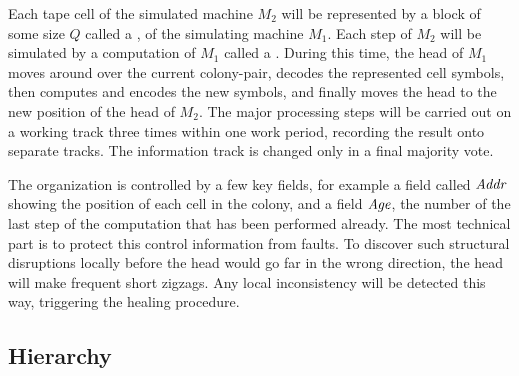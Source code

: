\documentclass[11pt]{memoir}
\theoremstyle{definition} %
\newcommand{\fld}[1]{\ensuremath{\textit{#1\/}}}
\newcommand{\Q}{Q} %
\newcommand{\Addr}{\fld{Addr}}
\newcommand{\Age}{\fld{Age}} %
\begin{document}
Each tape cell of the simulated machine \( M_{2} \) will be represented by a block of
some size \( \Q \) called a , of the simulating machine \( M_{1} \).
Each step of \( M_{2} \) will be simulated by a computation of \( M_{1} \) called
a .
During this time, the head of \( M_{1} \) moves around over the
current colony-pair, decodes the represented cell symbols,
then computes and encodes the new symbols, and finally moves the head 
to the new position of the head of \( M_{2} \).
The major processing steps will be 
carried out on a working track three times within one work period,
recording the result onto separate tracks.
The information track is changed only in a final majority vote.

The organization is controlled by a few key fields, for example a field
called \( \Addr \) showing the position of each cell in the colony, and a field
\( \Age \), the number of the last step of the computation
that has been performed already.
The most technical part is to protect this control information from faults.
To discover such structural disruptions locally
before the head would go far in the wrong direction,
the head will make frequent short zigzags.
Any local inconsistency will be detected this way, triggering the healing procedure.


\subsection{Hierarchy}\label{sec:hier}
\end{document}
